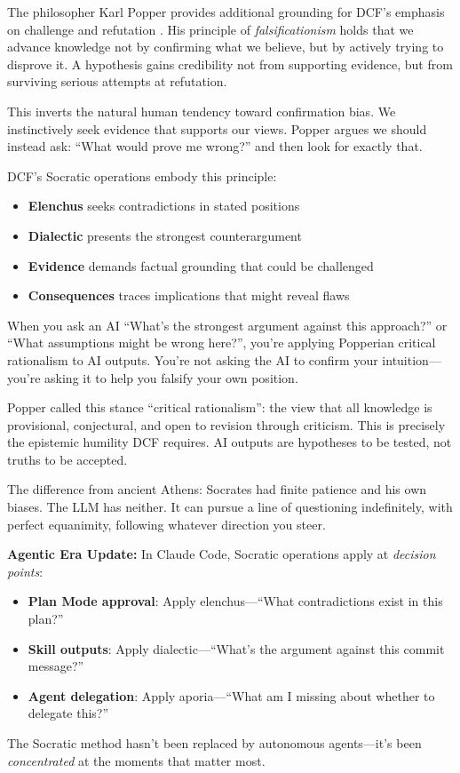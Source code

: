 The philosopher Karl Popper provides additional grounding for DCF's emphasis on challenge and refutation \cite{popper1963conjectures}. His principle of \emph{falsificationism} holds that we advance knowledge not by confirming what we believe, but by actively trying to disprove it. A hypothesis gains credibility not from supporting evidence, but from surviving serious attempts at refutation.

This inverts the natural human tendency toward confirmation bias. We instinctively seek evidence that supports our views. Popper argues we should instead ask: ``What would prove me wrong?'' and then look for exactly that.

DCF's Socratic operations embody this principle:

\begin{itemize}
    \item \textbf{Elenchus} seeks contradictions in stated positions
    \item \textbf{Dialectic} presents the strongest counterargument
    \item \textbf{Evidence} demands factual grounding that could be challenged
    \item \textbf{Consequences} traces implications that might reveal flaws
\end{itemize}

When you ask an AI ``What's the strongest argument against this approach?'' or ``What assumptions might be wrong here?'', you're applying Popperian critical rationalism to AI outputs. You're not asking the AI to confirm your intuition---you're asking it to help you falsify your own position.

Popper called this stance ``critical rationalism'': the view that all knowledge is provisional, conjectural, and open to revision through criticism. This is precisely the epistemic humility DCF requires. AI outputs are hypotheses to be tested, not truths to be accepted.

The difference from ancient Athens: Socrates had finite patience and his own biases. The LLM has neither. It can pursue a line of questioning indefinitely, with perfect equanimity, following whatever direction you steer.

\begin{quotebox}
\textbf{Agentic Era Update:} In Claude Code, Socratic operations apply at \emph{decision points}:
\begin{itemize}
    \item \textbf{Plan Mode approval}: Apply elenchus---``What contradictions exist in this plan?''
    \item \textbf{Skill outputs}: Apply dialectic---``What's the argument against this commit message?''
    \item \textbf{Agent delegation}: Apply aporia---``What am I missing about whether to delegate this?''
\end{itemize}
The Socratic method hasn't been replaced by autonomous agents---it's been \emph{concentrated} at the moments that matter most.
\end{quotebox}
